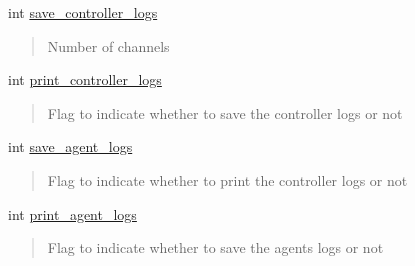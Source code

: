 \begin{DoxyCompactItemize}
\begin{DoxyCompactList}
\end{DoxyCompactList}\item 
\mbox{\label{classMlModel_a6fd79e984bf235c412d313768e1cb279}} 
int \hyperlink{classMlModel_a6fd79e984bf235c412d313768e1cb279}{save\+\_\+controller\+\_\+logs}
\begin{DoxyCompactList}\small\item\em \begin{quote}
Number of channels \end{quote}
\end{DoxyCompactList}\item 
\mbox{\label{classMlModel_a6bf26ea5168a4f6ba4f2ee4239349a61}} 
int \hyperlink{classMlModel_a6bf26ea5168a4f6ba4f2ee4239349a61}{print\+\_\+controller\+\_\+logs}
\begin{DoxyCompactList}\small\item\em \begin{quote}
Flag to indicate whether to save the controller logs or not \end{quote}
\end{DoxyCompactList}\item 
\mbox{\label{classMlModel_a43dd70b84841ba941319a62a9c0992b4}} 
int \hyperlink{classMlModel_a43dd70b84841ba941319a62a9c0992b4}{save\+\_\+agent\+\_\+logs}
\begin{DoxyCompactList}\small\item\em \begin{quote}
Flag to indicate whether to print the controller logs or not \end{quote}
\end{DoxyCompactList}\item 
\mbox{\label{classMlModel_ae8d3568496b274b42f778e46ccd1b1f8}} 
int \hyperlink{classMlModel_ae8d3568496b274b42f778e46ccd1b1f8}{print\+\_\+agent\+\_\+logs}
\begin{DoxyCompactList}\small\item\em \begin{quote}
Flag to indicate whether to save the agents logs or not \end{quote}
\end{DoxyCompactList}\item 
\mbox{\label{classMlModel_a3661d0ceeb731a506b28886cddd23e03}} 

\end{DoxyCompactItemize}
